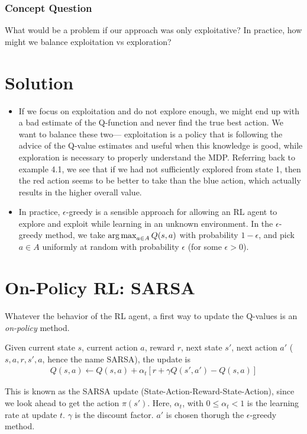 \documentclass[11pt, letterpaper]{article}
\newenvironment{solution}
  {\color{blue}\section*{Solution}}
{}
\begin{document}
\subsubsection{Concept Question}

What would be a problem if our approach was only exploitative? In
practice, how might we balance exploitation vs exploration?
%
\begin{solution}
\begin{itemize}
\item If we focus on exploitation and do not explore enough,
    we might end up with a bad estimate of the Q-function and never
    find the true best action. We want to balance these two---
    exploitation  is a policy that is following the advice of the
    Q-value estimates and useful when this knowledge is good,
    while exploration is necessary to properly understand the MDP. Referring back to example 4.1, we see that if we had not sufficiently explored from state 1, then the red action seems to be better to take than the blue action, which actually results in the higher overall value.
%
\item In practice, $\epsilon$-greedy is a sensible approach
    for allowing an RL agent to explore and exploit while learning in an
    unknown environment.
    In the $\epsilon$-greedy method, we take $\argmax_{a \in A} Q(s,a)$ with probability $1-\epsilon$, and pick $a \in A$ uniformly at random with probability $\epsilon$ (for some $\epsilon>0$).
%
\end{itemize}
\end{solution}

\section{On-Policy RL: SARSA}

Whatever the behavior of the RL agent, a first way to update the 
Q-values is
an \emph{on-policy} method.

Given current state $s$, current
action $a$, reward $r$, next state $s'$, next action $a'$
($s,a,r,s',a$, hence the name SARSA), the update is
%
%
\begin{align}
    Q(s,a) \leftarrow Q(s,a) + \alpha_t\left[ r + \gamma Q(s', a') - Q(s,a)\right]
\end{align}

This is known as the SARSA update (State-Action-Reward-State-Action),
since we look ahead to get the action $\pi(s')$.  Here, $\alpha_t$,
with $0\leq \alpha_t<1$ is the learning rate at update $t$.
$\gamma$ is the discount factor. $a'$ is chosen thorugh the $\epsilon$-greedy method.
\end{document}
